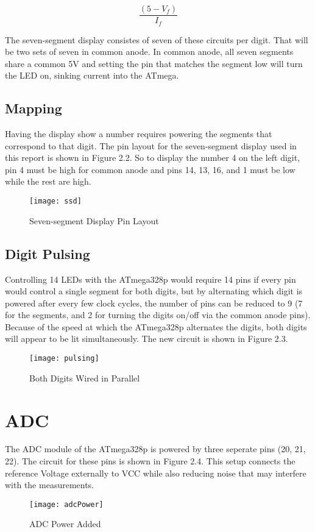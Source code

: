 \documentclass[main.tex]{subfiles}
\begin{document}
			\[
				\frac{\left(5 - V_f\right)}{I_f}
			\]
		
		The seven-segment display consistes of seven of these circuits per digit. That will be two sets
		of seven in common anode. In common anode, all seven segments share a common 5V and setting the
		pin that matches the segment low will turn the LED on, sinking current into the ATmega.
		
		
		\subsection{Mapping}
		Having the display show a number requires powering the segments that correspond to that digit.
		The pin layout for the seven-segment display used in this report is shown in Figure 2.2.
		So to display the number 4 on the left digit, pin 4 must be high for common anode and pins
		14, 13, 16, and 1 must be low while the rest are high.
		\begin{figure}[H]
			\begin{center}
				\texttt{[image: ssd]}
			\end{center}
			\caption{Seven-segment Display Pin Layout}
			\label{fig:sevenSegment}
		\end{figure}
		
		\subsection{Digit Pulsing}
		Controlling 14 LEDs with the ATmega328p would require 14 pins if every pin would control a single
		segment for both digits, but by alternating which digit is powered after every few clock cycles,
		the number of pins can be reduced to 9 (7 for the segments, and 2 for turning the digits on/off
		via the common anode pins). Because of the speed at which the ATmega328p alternates the digits,
		both digits will appear to be lit simultaneously. The new circuit is shown in Figure 2.3.
		\begin{figure}[H]
			\begin{center}
				\texttt{[image: pulsing]}
			\end{center}
			\caption{Both Digits Wired in Parallel}
			\label{fig:pulse}
		\end{figure}
		
	\section{ADC}
	The ADC module of the ATmega328p is powered by three seperate pins (20, 21, 22). The circuit for
	these pins is shown in Figure 2.4. This setup connects the reference Voltage externally to 
	VCC while also reducing noise that may interfere with the measurements.
	\begin{figure}[H]
		\begin{center}
			\texttt{[image: adcPower]}
		\end{center}
		\caption{ADC Power Added}
		\label{fig:adcPwr}
	\end{figure}
\end{document}

